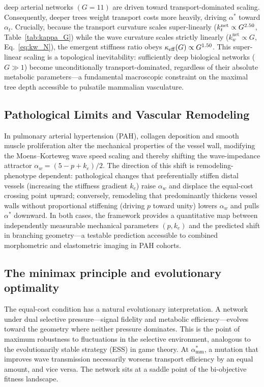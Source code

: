 \documentclass[11pt,a4paper]{article}
\theoremstyle{remark}
\begin{document}
deep arterial networks $(G=11)$ are driven toward transport-dominated scaling.
Consequently, deeper trees weight transport costs more heavily, driving
$\alpha^*$ toward $\alpha_t$.
Crucially, because the transport curvature scales super-linearly
($k_t^\mathrm{net} \propto G^{2.50}$, Table~\ref{tab:kappa_G})
while the wave curvature scales strictly linearly ($k_w^\mathrm{net} \propto G$,
Eq.~\eqref{eq:kw_N}), the emergent stiffness ratio obeys
$\kappa_\mathrm{eff}(G) \propto G^{1.50}$.
This super-linear scaling is a topological inevitability: sufficiently deep
biological networks ($G \gg 1$) become unconditionally transport-dominated,
regardless of their absolute metabolic parameters---a fundamental macroscopic
constraint on the maximal tree depth accessible to pulsatile mammalian
vasculature.

\subsection{Pathological Limits and Vascular Remodeling}
In pulmonary arterial hypertension (PAH), collagen deposition and
smooth muscle proliferation alter the mechanical properties of the
vessel wall, modifying the Moens--Korteweg wave speed scaling and
thereby shifting the wave-impedance attractor
$\alpha_w = (5 - p + k_e)/2$. The direction of this shift is
remodeling-phenotype dependent: pathological changes that
preferentially stiffen distal vessels (increasing the stiffness
gradient $k_e$) raise $\alpha_w$ and displace the equal-cost
crossing point upward; conversely, remodeling that predominantly
thickens vessel walls without proportional stiffening (driving $p$
toward unity) lowers $\alpha_w$ and pulls $\alpha^*$ downward. In
both cases, the framework provides a quantitative map between
independently measurable mechanical parameters $(p, k_e)$ and the
predicted shift in branching geometry---a testable prediction
accessible to combined morphometric and elastometric imaging in
PAH cohorts.

\subsection{The minimax principle and evolutionary optimality}
The equal-cost condition has a natural evolutionary interpretation. A network
under dual selective pressure---signal fidelity and metabolic
efficiency---evolves toward the geometry where neither pressure dominates. This
is the point of maximum robustness to fluctuations in the selective environment,
analogous to the evolutionarily stable strategy (ESS) in game theory. At
$\alpha^*_{\mathrm{mm}}$, a mutation that improves wave transmission necessarily
worsens transport efficiency by an equal amount, and vice versa. The network
sits at a saddle point of the bi-objective fitness landscape.
\end{document}
